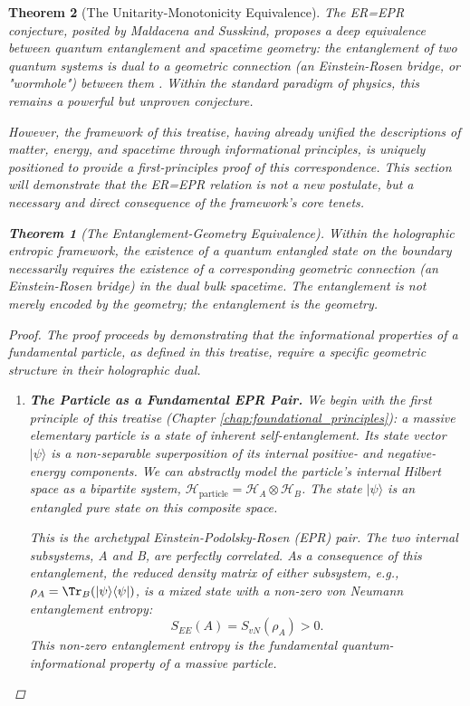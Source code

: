 \documentclass[11pt, letterpaper]{report}
\theoremstyle{plain} %
\newtheorem{theorem}{Theorem}[chapter]
\theoremstyle{definition} %
\theoremstyle{remark} %
\begin{document}
\begin{theorem}[The Unitarity-Monotonicity Equivalence]
The ER=EPR conjecture, posited by Maldacena and Susskind, proposes a deep equivalence between quantum entanglement and spacetime geometry: the entanglement of two quantum systems is dual to a geometric connection (an Einstein-Rosen bridge, or "wormhole") between them \cite{Maldacena2013Cool}. Within the standard paradigm of physics, this remains a powerful but unproven conjecture.

However, the framework of this treatise, having already unified the descriptions of matter, energy, and spacetime through informational principles, is uniquely positioned to provide a first-principles proof of this correspondence. This section will demonstrate that the ER=EPR relation is not a new postulate, but a necessary and direct consequence of the framework's core tenets.

\begin{theorem}[The Entanglement-Geometry Equivalence]
\label{thm:er_epr_proof}
Within the holographic entropic framework, the existence of a quantum entangled state on the boundary necessarily requires the existence of a corresponding geometric connection (an Einstein-Rosen bridge) in the dual bulk spacetime. The entanglement is not merely encoded by the geometry; the entanglement \textit{is} the geometry.
\end{theorem}
\begin{proof}
The proof proceeds by demonstrating that the informational properties of a fundamental particle, as defined in this treatise, require a specific geometric structure in their holographic dual.

\begin{enumerate}
    \item \textbf{The Particle as a Fundamental EPR Pair.}
    We begin with the first principle of this treatise (Chapter \ref{chap:foundational_principles}): a massive elementary particle is a state of inherent self-entanglement. Its state vector $|\psi\rangle$ is a non-separable superposition of its internal positive- and negative-energy components. We can abstractly model the particle's internal Hilbert space as a bipartite system, $\mathcal{H}_{\text{particle}} = \mathcal{H}_A \otimes \mathcal{H}_B$. The state $|\psi\rangle$ is an entangled pure state on this composite space.
    
    This is the archetypal Einstein-Podolsky-Rosen (EPR) pair. The two internal subsystems, A and B, are perfectly correlated. As a consequence of this entanglement, the reduced density matrix of either subsystem, e.g., $\rho_A = \Tr_B(|\psi\rangle\langle\psi|)$, is a mixed state with a non-zero von Neumann entanglement entropy:
    \begin{equation}
        S_{EE}(A) = S_{vN}(\rho_A) > 0.
    \end{equation}
    This non-zero entanglement entropy is the fundamental quantum-informational property of a massive particle.


\end{enumerate}
\end{proof}
\end{theorem}
\end{document}
